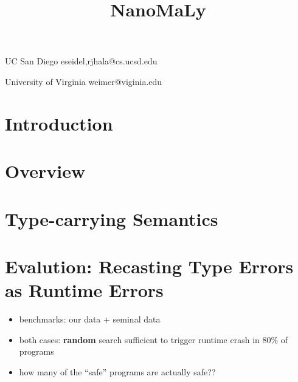 \documentclass[pldi,indentedstyle=false]{sigplanconf-pldi15}
\begin{document}
%
%

\title{NanoMaLy}

           {UC San Diego}
           {{eseidel,rjhala}@cs.ucsd.edu}

           {University of Virginia}
           {weimer@viginia.edu}

\maketitle
\begin{abstract}
\end{abstract}



\section{Introduction}          %
\section{Overview}              %
\section{Type-carrying Semantics} %





\section{Evalution: Recasting Type Errors as Runtime Errors} %
\label{sec:eval-recast-type}
\begin{itemize}
\item benchmarks: our data + seminal data
\item both cases: \textbf{random} search sufficient to trigger runtime crash in 80\% of programs
\item how many of the ``safe'' programs are actually safe??
\end{itemize}
\end{document}
